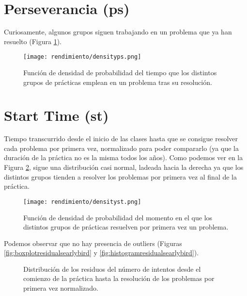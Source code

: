 \section{Perseverancia (ps)}

Curiosamente, algunos grupos siguen trabajando en un problema que ya han resuelto (Figura \ref{fig:densityplotps}).

\begin{figure}[H]
    \centering
    \texttt{[image: rendimiento/densityps.png]}
    \caption{Función de densidad de probabilidad del tiempo que los distintos grupos de prácticas emplean en un problema tras su resolución.}
    \label{fig:densityplotps}
\end{figure}

\section{Start Time (st)}

Tiempo transcurrido desde el inicio de las clases hasta que se consigue resolver cada problema por primera vez, normalizado para poder compararlo (ya que la duración de la práctica no es la misma todos los años). Como podemos ver en la Figura \ref{fig:densityplotearlybird}, sigue una distribución casi normal, ladeada hacia la derecha ya que los distintos grupos tienden a resolver los problemas por primera vez al final de la práctica.

\begin{figure}[H]
    \centering
    \texttt{[image: rendimiento/densityst.png]}
    \caption{Función de densidad de probabilidad del momento en el que los distintos grupos de prácticas resuelven por primera vez un problema.}
    \label{fig:densityplotearlybird}
\end{figure}

Podemos observar que no hay presencia de outliers (Figuras \ref{fig:boxplotresidualsearlybird} y \ref{fig:histogramresidualsearlybird}).

\begin{figure}[H]
\centering
{}\qquad
{}
\caption{Distribución de los residuos del número de intentos desde el comienzo de la práctica hasta la resolución de los problemas por primera vez normalizado.}
\label{fig:earlybird}
\end{figure}

